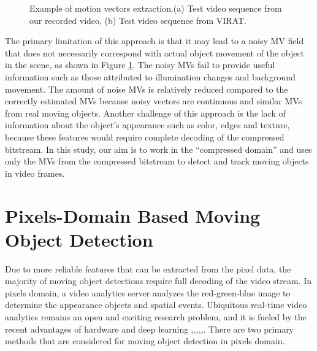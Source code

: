 \begin{figure}
\centering
{}
 \caption{ Example of motion vectors extraction.(a) Test video sequence from our recorded video, (b) Test video sequence from VIRAT.}
 \label{fig:noise}
\end{figure}

The primary limitation of this approach is that it may lead to a noisy MV field that does not necessarily correspond with actual object movement of the object in the scene, as shown in Figure \ref{fig:noise}. The noisy MVs fail to provide useful information such as those attributed to illumination changes and background movement. The amount of noise MVs is relatively reduced compared to the correctly estimated MVs because noisy vectors are continuous and similar MVs from real moving objects. Another challenge of this approach is the lack of information about the object’s appearance such as color, edges and texture, because these features would require complete decoding of the compressed bitstream. In this study, our aim is to work in the “compressed domain” and uses only the MVs from the compressed bitstream to detect and track moving objects in video frames. 

\section{Pixels-Domain Based Moving Object Detection}
Due to more reliable features that can be extracted from the pixel data, the majority of moving object detections require full decoding of the video stream. In pixels domain, a video analytics server analyzes the red-green-blue image to determine the appearance objects and spatial events. Ubiquitous real-time video analytics remains an open and exciting research problem, and it is fueled by the recent advantages of hardware and deep learning \cite{zeng2018background},\cite{chen2017pixel},\cite{babaee2018deep},\cite{wang2017interactive},\cite{patil2018msfgnet},\cite{ou2019moving}. There are two primary methods that are considered for moving object detection in pixels domain.
